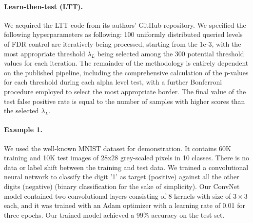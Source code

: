 \documentclass{article}
\begin{document}
\paragraph{Learn-then-test (LTT).} We acquired the LTT code from its authors' GitHub repository. We  specified the following hyperparameters as following: 100 uniformly distributed queried levels of FDR control are iteratively being processed, starting from the 1e-3, with the most appropriate threshold $\lambda_L$ being selected among the 300 potential threshold values for each iteration. The remainder of the methodology is entirely dependent on the published pipeline, including the comprehensive calculation of the p-values for each threshold during each alpha level test, with a further Bonferroni procedure employed to select the most appropriate border. The final value of the test false positive rate is equal to the number of samples with higher scores than the selected $\lambda_L$. 

\paragraph{Example 	 1.} \label{ex:vanilla} We used the well-known MNIST dataset for demonstration. It contains 60K training and 10K test images of 28x28 grey-scaled pixels in 10 classes. There is no data or label shift between the training and test data. We trained a convolutional neural network to classify the digit '1' as target (positive) against all the other digits (negative) (binary classification for the sake of simplicity). Our ConvNet model contained two convolutional layers consisting of 8 kernels with size of $3\times3$ each, and it was trained with an Adam optimizer with a learning rate of 0.01 for three epochs. Our trained model achieved a 99\% accuracy on the test set. 
\end{document}
